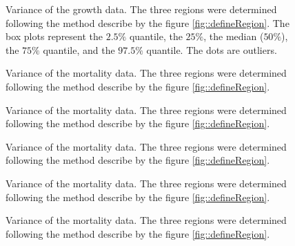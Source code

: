 \documentclass[letterpaper, 12pt]{article}
\theoremstyle{theo}
\begin{document}
\begin{refsection}
\begin{onehalfspace}
\begin{figure}
	\centering
	
	\caption[Growth variation, species 13--14]{Variance of the growth data. The three regions were determined following the method describe by the figure \ref{fig::defineRegion}. The box plots represent the $ 2.5 \%$ quantile, the $ 25 \% $, the median ($ 50 \% $), the $ 75 \% $ quantile, and the $ 97.5 \% $ quantile. The dots are outliers. \label{fig::growthVar13-14}}
\end{figure}

\begin{figure}
	\centering
	
	\caption[Mortality variation, species 1--3]{Variance of the mortality data. The three regions were determined following the method describe by the figure \ref{fig::defineRegion}. \label{fig::mortalityVar1-3}}
\end{figure}

\begin{figure}
	\centering
	
	\caption[Mortality variation, species 4--6]{Variance of the mortality data. The three regions were determined following the method describe by the figure \ref{fig::defineRegion}. \label{fig::mortalityVa4-6}}
\end{figure}

\begin{figure}
	\centering
	
	\caption[Mortality variation, species 7--9]{Variance of the mortality data. The three regions were determined following the method describe by the figure \ref{fig::defineRegion}. \label{fig::mortalityVa7-9}}
\end{figure}

\begin{figure}
	\centering
	
	\caption[Mortality variation, species 10--12]{Variance of the mortality data. The three regions were determined following the method describe by the figure \ref{fig::defineRegion}. \label{fig::mortalityVar10-12}}
\end{figure}

\begin{figure}
	\centering
	
	\caption[Mortality variation, species 13--14]{Variance of the mortality data. The three regions were determined following the method describe by the figure \ref{fig::defineRegion}. \label{fig::mortalityVar13-14}}
\end{figure}

\end{onehalfspace}

\clearpage
\printbibliography[heading=subbibliography]
\end{refsection}
\end{document}
